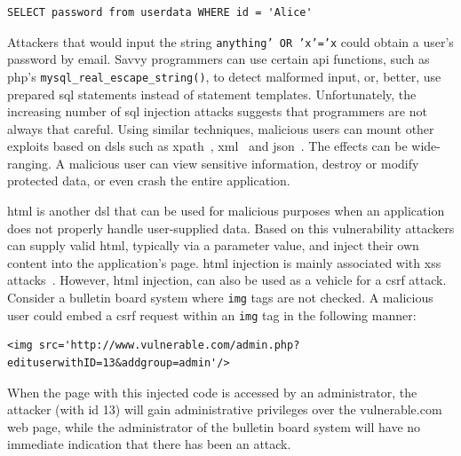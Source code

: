 \documentclass[conference]{IEEEtran}
\begin{document}
\lstset{language=SQL}
\begin{lstlisting}
SELECT password from userdata WHERE id = 'Alice'
\end{lstlisting}

\noindent
Attackers that would input the string {\tt anything' OR 'x'='x}
could obtain a user's password by email. Savvy
programmers can use certain {\sc api} functions, such as {\sc php}'s
{\tt mysql\_real\_escape\_string()}, to detect malformed input, or,
better, use prepared {\sc sql} statements instead of statement
templates. Unfortunately, the increasing number of {\sc sql} injection
attacks suggests that programmers are not always that careful. Using
similar techniques, malicious users can mount other exploits based on
{\sc dsl}s such as {\sc xp}ath~\cite{SW06,CDL07,MKS09}, {\sc
  xml}~\cite{MSM13} and {\sc json}~\cite{SMS13}. The effects can be
wide-ranging. A malicious user can view sensitive information, destroy
or modify protected data, or even crash the entire application.

{\sc html} is another {\sc dsl} that can be used for malicious
purposes when an application does not properly handle user-supplied
data. Based on this vulnerability attackers can supply valid {\sc
  html}, typically via a parameter value, and inject their own content
into the application's page. {\sc html} injection is mainly associated
with {\sc xss} attacks~\cite{BJM08,LZRL09}. However, {\sc html} injection,
can also be used as a vehicle for a {\sc csrf} attack.
Consider a bulletin board system where {\tt img} tags are not checked.
A malicious user could embed a {\sc csrf} request within an
{\tt img} tag in the following manner:

\lstset{language=HTML}
\begin{lstlisting}
<img src='http://www.vulnerable.com/admin.php?edituserwithID=13&addgroup=admin'/>
\end{lstlisting}

\noindent
When the page with this injected code is accessed by an administrator,
the attacker (with {\sc id} 13) will gain administrative privileges
over the vulnerable.com web page,
while the administrator of the bulletin board system
will have no immediate indication that there has been an attack.
\end{document}
